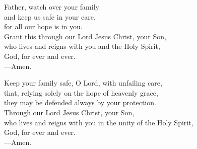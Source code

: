\prayer


\begin{prayerverse}
Father, watch over your family\\
and keep us safe in your care,\\
for all our hope is in you.\\
Grant this through our Lord Jesus Christ, your Son,\\
who lives and reigns with you and the Holy Spirit,\\
God, for ever and ever.\\
{\color{red}---\thinspace}Amen.
\end{prayerverse}


\begin{prayerverse}
Keep your family safe, O Lord, with unfailing care,\\
that, relying solely on the hope of heavenly grace,\\
they may be defended always by your protection.\\
Through our Lord Jesus Christ, your Son,\\
who lives and reigns with you in the unity of the Holy Spirit,\\
God, for ever and ever.\\
{\color{red}---\thinspace}Amen.
\end{prayerverse}

